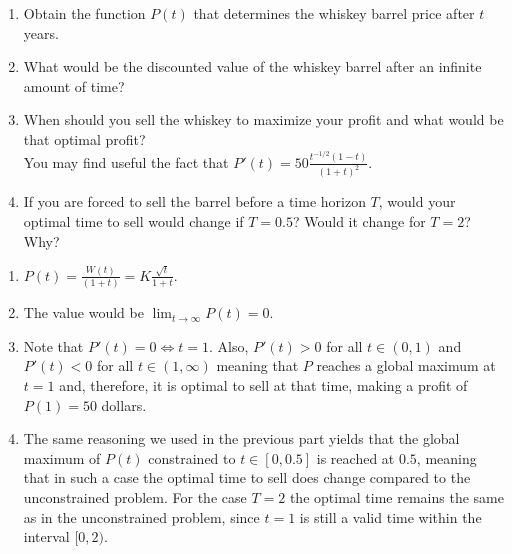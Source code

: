 \documentclass[11pt]{exam}
\begin{document}
\begin{questions}
    \begin{enumerate}[leftmargin = 0.5cm, label = (\alph*), rightmargin = 0.2cm]
        
        \item Obtain the function $P(t)$ that determines the whiskey barrel price after $t$ years.

        \item What would be the discounted value of the whiskey barrel after an infinite amount of time?

        \item When should you sell the whiskey to maximize your profit and what would be that optimal profit? \\
        You may find useful the fact that $P'(t) = 50\frac{t^{-1/2}(1 - t)}{(1 + t)^2}$.

        \item If you are forced to sell the barrel before a time horizon $T$, would your optimal time to sell would change if $T = 0.5$? Would it change for $T = 2$? Why?
        
    \end{enumerate}
    
\begin{solution}[0cm]
    \begin{enumerate}[leftmargin = 0.5cm, label = (\alph*), rightmargin = 0.2cm]
        \item $P(t) = \frac{W(t)}{(1+t)} = K \frac{\sqrt{t}}{1+t}$.
        \item The value would be $\lim_{t\rightarrow\infty} P(t) = 0$.
        \item Note that $P'(t) = 0 \Longleftrightarrow t = 1$. Also, $P'(t) > 0$ for all $t\in(0, 1)$ and $P'(t) < 0$ for all $t\in(1, \infty)$ meaning that $P$ reaches a global maximum at $t = 1$ and, therefore, it is optimal to sell at that time, making a profit of $P(1) = 50$ dollars.
        \item The same reasoning we used in the previous part yields that the global maximum of $P(t)$ constrained to $t\in[0, 0.5]$ is reached at $0.5$, meaning that in such a case the optimal time to sell does change compared to the unconstrained problem. For the case $T = 2$ the optimal time remains the same as in the unconstrained problem, since $t = 1$ is still a valid time within the interval $[0, 2)$.         
    \end{enumerate}
\end{solution}


\end{questions}
\end{document}
